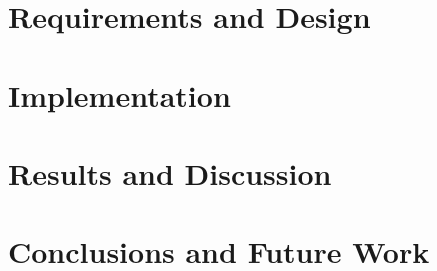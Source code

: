 \documentclass[12pt,a4paper]{report}
\begin{document}


\chapter{Requirements and Design}




\chapter{Implementation}



\chapter{Results and Discussion}



\chapter{Conclusions and Future Work}




\end{document}
